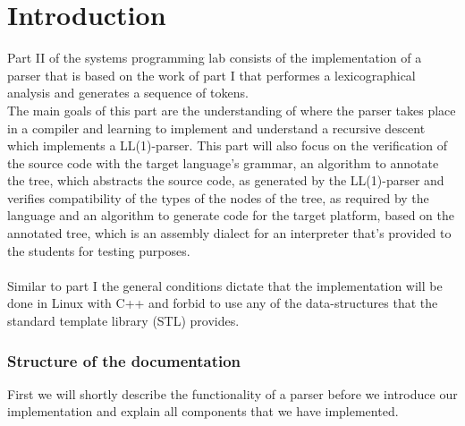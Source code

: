\section{Introduction}
Part II of the systems programming lab consists of the implementation of a parser that is based on the work of part I that performes a lexicographical analysis and generates a sequence of tokens.\\
The main goals of this part are the understanding of where the parser takes place in a compiler and learning to implement and understand a recursive descent which implements a LL(1)-parser. This part will also focus on the verification of the source code with the target language’s grammar, an algorithm to annotate the tree, which abstracts the source code, as generated by the LL(1)-parser and verifies compatibility of the types of the nodes of the tree, as required by the language and an algorithm to generate code for the target platform, based on the annotated tree, which is an assembly dialect for an interpreter that’s provided to the students for testing purposes.
\\\\
Similar to part I the general conditions dictate that the implementation will be done in Linux with C++
and forbid to use any of the data-structures that the standard template library (STL) provides.

\subsubsection*{Structure of the documentation}
First we will shortly describe the functionality of a parser before we introduce our implementation and explain all components that we have implemented.